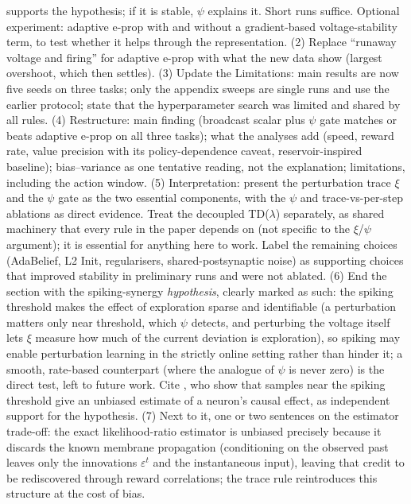 \documentclass[10pt,twocolumn]{article}
\begin{document}
{supports the hypothesis; if it is stable, $\psi$ explains it. Short runs
suffice. Optional experiment: adaptive e-prop with and without a gradient-based
voltage-stability term, to test whether it helps through the representation.
(2) Replace ``runaway voltage and firing'' for adaptive e-prop with what the
new data show (largest overshoot, which then settles). (3) Update the
Limitations: main results are now five seeds on three tasks; only the appendix
sweeps are single runs and use the earlier protocol; state that the
hyperparameter search was limited and shared by all rules. (4) Restructure:
main finding (broadcast scalar plus $\psi$ gate matches or beats adaptive
e-prop on all three tasks); what the analyses add (speed, reward rate, value
precision with its policy-dependence caveat, reservoir-inspired baseline);
bias--variance as one tentative reading, not the explanation; limitations,
including the action window. (5) Interpretation: present the perturbation trace $\xi$ and the $\psi$ gate as
the two essential components, with the $\psi$ and trace-vs-per-step ablations
as direct evidence. Treat the decoupled TD($\lambda$) separately, as shared
machinery that every rule in the paper depends on (not specific to the
$\xi$/$\psi$ argument); it is essential for anything here to work. Label the
remaining choices (AdaBelief, L2 Init, regularisers, shared-postsynaptic noise)
as supporting choices that improved stability in preliminary runs and were not
ablated. (6) End the
section with the spiking-synergy \emph{hypothesis}, clearly marked as such: the
spiking threshold makes the effect of exploration sparse and identifiable
(a perturbation matters only near threshold, which $\psi$ detects, and
perturbing the voltage itself lets $\xi$ measure how much of the current
deviation is exploration), so spiking may enable perturbation learning in the
strictly online setting rather than hinder it; a smooth, rate-based counterpart
(where the analogue of $\psi$ is never zero) is the direct test, left to
future work. Cite \citet{Lansdell2023}, who show that samples near the spiking
threshold give an unbiased estimate of a neuron's causal effect, as independent
support for the hypothesis. (7) Next to it, one or two sentences on the
estimator trade-off: the exact likelihood-ratio estimator is unbiased
precisely because it discards the known membrane propagation (conditioning on
the observed past leaves only the innovations $\varepsilon^t$ and the
instantaneous input), leaving that credit to be rediscovered through reward
correlations; the trace rule reintroduces this structure at the cost of bias.
}
\end{document}
